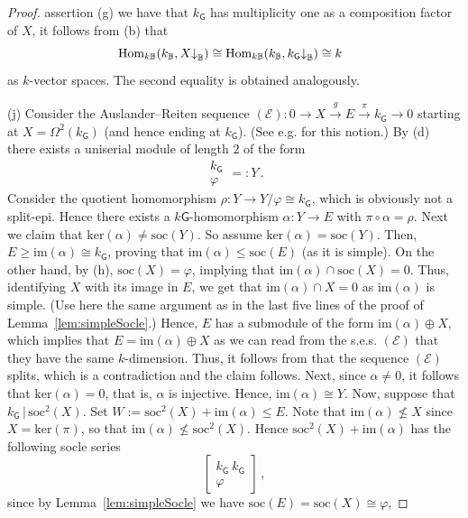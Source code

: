 \documentclass[12pt,a4paper]{amsart}
\theoremstyle{plain}\newtheorem{Theorem}{Theorem}[section]
\theoremstyle{plain}\newtheorem{Conjecture}[Theorem]{Conjecture}
\theoremstyle{plain}\newtheorem{Corollary}[Theorem]{Corollary}
\theoremstyle{plain}\newtheorem{Lemma}[Theorem]{Lemma}
\theoremstyle{plain}\newtheorem{Proposition}[Theorem]{Proposition}
\theoremstyle{definition}\newtheorem{Definition}[Theorem]{Definition}
\theoremstyle{definition}\newtheorem{Example}[Theorem]{Example}
\theoremstyle{definition}\newtheorem{Examples}[Theorem]{Examples}
\theoremstyle{definition}\newtheorem{Remark}[Theorem]{Remark}
\theoremstyle{definition}\newtheorem{Question}[Theorem]{Question}
\theoremstyle{definition}\newtheorem{Notation}[Theorem]{Notation}
\theoremstyle{definition}\newtheorem{Hypothesis}[Theorem]{Hypothesis}
\theoremstyle{definition}\newtheorem{Assumption}[Theorem]{Assumption}
\theoremstyle{definition}\newtheorem{Strategy}[Theorem]{Strategy}
\theoremstyle{definition}\newtheorem{Contents}[Theorem]{Contents}
\theoremstyle{definition}\newtheorem{Computations}[Theorem]{Computations}
\theoremstyle{definition}\newtheorem{Equivalences}[Theorem]{Equivalences}
\theoremstyle{definition}\newtheorem{Notation/Definition}[Theorem]{Notation/Definition}
\theoremstyle{definition}\newtheorem{noth}[Theorem]{}
\theoremstyle{plain}\newtheorem{Step}[Theorem]{Step}
\def\im{\mathrm{im}}
\def\ker{\mathrm{ker}} \def\tenkT{\otimes_{kT}} \def\Id{\mathrm{Id}}
\def\soc{\mathrm{soc}} \def\tenOS{\otimes_{\mathcal{O}S}} \def\Tr{\mathrm{Tr}}
\begin{document}
\begin{proof}
assertion (g) we have that $k_{\mathsf{G}}$ 
has multiplicity one as a composition factor of $X$, it follows from (b) that 
$$
 \mathrm{Hom}_{k\mathbb B}(k_{\mathbb B}, X{\downarrow}_{\mathbb B})
\cong \mathrm{Hom}_{k\mathbb B}(k_{\mathbb B}, k_\mathsf{G}{\downarrow}_{\mathbb B}) \cong k\ \
$$
as $k$-vector spaces.  The second equality is obtained \smallskip analogously.  
\par
(j) 
Consider the Auslander--Reiten sequence $(\mathcal E):0\rightarrow X\overset{g}{\rightarrow} E
\overset{\pi}\rightarrow k_{\mathsf{G}}\rightarrow 0$
starting at $X=\Omega^{2}(k_{\mathsf{G}})$ (and hence ending at $k_{\mathsf{G}}$).
(See e.g. \cite[\S 34]{The95} for this notion.)
By (d) there exists a uniserial module of length $2$ of the form
$$\boxed{\begin{matrix}k_{\mathsf{G}}\\ \varphi\end{matrix}}=:Y\,.$$
Consider the quotient homomorphism 
$\rho:Y\rightarrow Y/\varphi\cong k_{\mathsf{G}}$, which is obviously not a split-epi. Hence
there exists a  $k{\mathsf{G}}$-homomorphism $\alpha: Y\rightarrow E$ with 
$\pi\circ\alpha =\rho$.
Next we claim that $\ker(\alpha) \not=\soc(Y)$.  So assume $\ker(\alpha) =\soc(Y)$. Then, 
$E\geq\im(\alpha)\cong k_{\mathsf{G}}$, proving that $\im(\alpha)\leq\soc(E)$ (as it is simple). 
On the other hand, by (h), $\soc(X)=\varphi$, implying that $\im(\alpha) \cap \soc(X)=0$.
Thus, identifying $X$ with its image in $E$, we get  that  $\im(\alpha)\cap X=0$ 
as  $\im(\alpha)$ is simple. (Use here the same argument as in the 
last five lines of the proof of Lemma~\ref{lem:simpleSocle}.) 
Hence, $E$ has a submodule of the form $\im(\alpha)\oplus X$, which implies that
$E=\im(\alpha)\oplus X$ as we can read from the s.e.s. $(\mathcal E)$
 that they have the same $k$-dimension. Thus, it follows from \cite[Lemma ~6.12]{Car96} that
the sequence $(\mathcal E)$ splits, which is a contradiction and the claim follows.
Next, since $\alpha \neq 0$, it follows that $\ker(\alpha)=0$, that is,  $\alpha$ is injective. 
Hence, $\im(\alpha)\cong Y$. 
Now, suppose that $k_{\mathsf{G}}\,|\,\soc^2(X)$. Set $W:=\soc^2(X)+\im(\alpha)\leq E$.
Note that $\im(\alpha) \not\leq X$ since $X=\ker(\pi)$, so that $\im(\alpha)\not\leq\soc^2(X)$.
Hence $\soc^2(X)+\im(\alpha)$ has 
the following socle series 
$$\begin{bmatrix}k_\mathsf{G} \ k_\mathsf{G} \\ \varphi\end{bmatrix}\,,$$
since by Lemma~\ref{lem:simpleSocle} we have $\soc(E)=\soc(X)\cong\varphi$, 

\end{proof}
\end{document}

